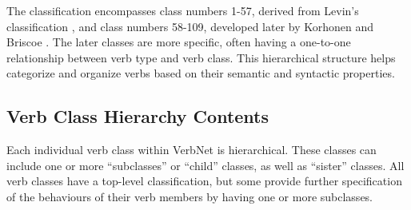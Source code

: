 The classification encompasses class numbers 1-57, derived from Levin's classification \cite{levin1993english}, and class numbers 58-109, developed later by Korhonen and Briscoe \cite{korhonen2004extended}. The later classes are more specific, often having a one-to-one relationship between verb type and verb class. This hierarchical structure helps categorize and organize verbs based on their semantic and syntactic properties.
\subsection*{Verb Class Hierarchy Contents}
Each individual verb class within VerbNet is hierarchical. These classes can include one or more \enquote{subclasses} or \enquote{child} classes, as well as \enquote{sister} classes. All verb classes have a top-level classification, but some provide further specification of the behaviours of their verb members by having one or more subclasses. 

